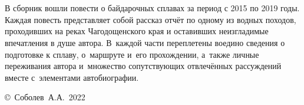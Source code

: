 \chapter*{}

В сборник вошли повести о байдарочных сплавах за период с 2015 по 2019 годы. Каждая повесть представляет собой рассказ отчёт по одному из водных походов, проходивших на реках Чагодощенского края и оставивших неизгладимые впечатления в душе автора. В~каждой части переплетены воедино сведения о подготовке к сплаву, о~маршруте и~его прохождении, а~также личные переживания автора и~множество сопутствующих отвлечённых рассуждений вместе с~элементами автобиографии.

\vspace{\fill}
\begin{flushright}
	\copyright~Соболев~А.А.~2022
\end{flushright}
